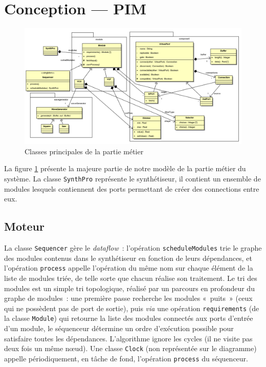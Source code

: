 \section{Conception — PIM}

\begin{figure}[htb]
\centering
\includegraphics[width=21cm,angle=90]{../img/ps/business-pim-light.pdf}
\caption{Classes principales de la partie métier}
\label{pim-class}
\end{figure}

La figure \ref{pim-class} présente la majeure partie de notre modèle de la partie
métier du système. La classe \verb!SynthPro! représente le
synthétiseur, il contient un ensemble de modules lesquels
contiennent des ports permettant de créer des connections entre
eux.

\subsection{Moteur}

La classe \verb!Sequencer! gère le \emph{dataflow}~: l'opération
\verb!scheduleModules! trie le graphe des modules contenus dans le
synthétiseur en fonction de leurs dépendances, et l'opération
\verb!process! appelle l'opération du même nom sur chaque élément
de la liste de modules triée, de telle sorte que chacun réalise son
traitement. Le tri des modules est un simple tri topologique,
réalisé par un parcours en profondeur du graphe de modules~: une
première passe recherche les modules «~puits~» (ceux qui ne
possèdent pas de port de sortie), puis \emph{via} une opération
\verb!requirements! (de la classe \verb!Module!) qui retourne la
liste des modules connectés aux ports d'entrée d'un module, le
séquenceur détermine un ordre d'exécution possible pour satisfaire
toutes les dépendances. L'algorithme ignore les cycles (il ne
visite pas deux fois un même nœud).
Une classe \texttt{Clock} (non représentée sur le diagramme) appelle périodiquement,
en tâche de fond, l’opération \texttt{process} du séquenceur.

